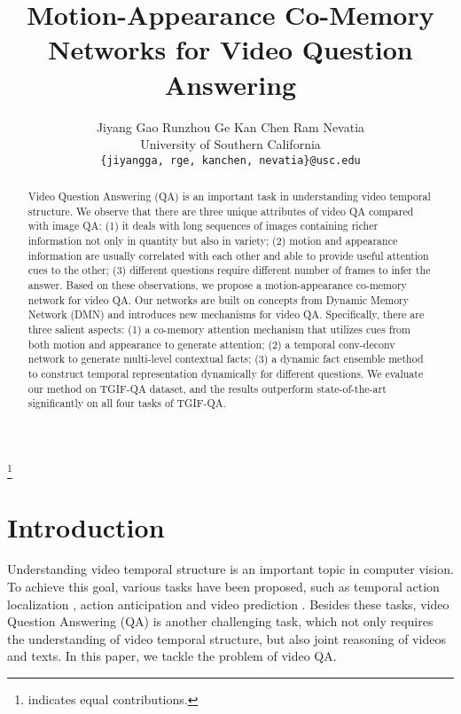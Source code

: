 \documentclass[10pt,twocolumn,letterpaper]{article}
\begin{document}
\title{Motion-Appearance Co-Memory Networks for Video Question Answering}


\author{Jiyang Gao \quad Runzhou Ge  \quad Kan Chen \quad Ram Nevatia \\
University of Southern California \\
{\tt\small \{jiyangga, rge, kanchen, nevatia\}@usc.edu} 
}

\maketitle

\newcommand\blfootnote[1]{\begingroup
  \renewcommand\thefootnote{}\footnote{#1}\addtocounter{footnote}{-1}\endgroup
}

\blfootnote{ indicates equal contributions.}






\begin{abstract}
Video Question Answering (QA) is an important task in understanding video temporal structure. We observe that there are three unique attributes of video QA compared with image QA: (1) it deals with long sequences of images containing richer information not only in quantity but also in variety; (2) motion and appearance information are usually correlated with each other and able to provide useful attention cues to the other; (3) different questions require different number of frames to infer the answer. Based on these observations, we propose a motion-appearance co-memory network for video QA. 
Our networks are built on concepts from Dynamic Memory Network (DMN) and introduces new mechanisms for video QA. Specifically, there are three salient aspects: (1) a co-memory attention mechanism that utilizes cues from both motion and appearance to generate attention; (2) a temporal conv-deconv network to generate multi-level contextual facts; (3) a dynamic fact ensemble method to construct temporal representation dynamically for different questions. We evaluate our method on TGIF-QA dataset, and the results outperform state-of-the-art significantly on all four tasks of TGIF-QA.
\end{abstract}



\section{Introduction}
\label{sec:intro}

Understanding video temporal structure is an important topic in computer vision. To achieve this goal, various tasks have been proposed, such as temporal action localization \cite{Shou_2016_CVPR, Gao_2017_cbr}, action anticipation \cite{gao2017red} and video prediction \cite{villegas2016decomposing}. Besides these tasks, video Question Answering (QA) \cite{Jang_2017_CVPR, Tapaswi_2016_CVPR} is another challenging task, which not only requires the understanding of video temporal structure, but also joint reasoning of videos and texts. In this paper, we tackle the problem of video QA.  
\end{document}
